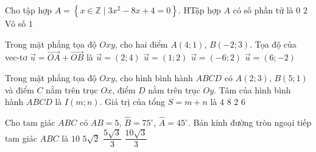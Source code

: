 \begin{ex}%
 Cho tập hợp $A=\left\{x \in \mathbb{Z} \mid 3 x^2-8 x+4=0\right\}$. HTập hợp $A$ có số phần tử là
\choice
{ $0$}
{ $2$}
{ Vô số}
{\True $1$}
\end{ex}

\begin{ex}%
Trong mặt phẳng tọa độ $Oxy$, cho hai điểm $A(4;1)$, $B(-2;3)$. Tọa độ của vec-tơ $\vec{u}=\vec{OA}+\vec{OB}$ là
\choice
{\True $\vec{u}=(2;4)$}
{$\vec{u}=(1;2)$}
{$\vec{u}=(-6;2)$}
{$\vec{u}=(6;-2)$}
\end{ex}

\begin{ex}%
Trong mặt phẳng tọa độ $Oxy$, cho hình bình hành $ABCD$ có $A(2;3)$, $B(5;1)$ và điểm $C$ nằm trên trục $Ox$, điểm $D$ nằm trên trục $Oy$. Tâm của hình bình hành $ABCD$ là $I(m;n)$. Giá trị của tổng $S=m+n$ là
\choice
{\True $4$}
{$8$}
{$2$}
{$6$}
\end{ex}

\begin{ex}%
Cho tam giác $ABC$ có $AB=5$, $\widehat{B}=75^\circ$, $\widehat{A}=45^\circ$. Bán kính đường tròn ngoại tiếp tam giác $ABC$ là
\choice
{$10$}
{$5 \sqrt{2}$}
{\True $\dfrac{5\sqrt{3}}{3}$}
{$\dfrac{10\sqrt{3}}{3}$}
\end{ex}

